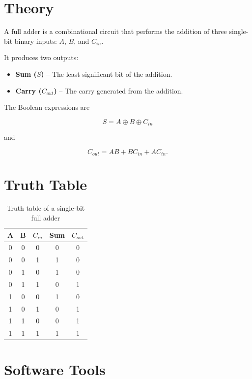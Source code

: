 \documentclass[12pt,a4paper]{report}
\begin{document}
\section{Theory}

A full adder is a combinational circuit that performs the addition of three single-bit binary inputs: $A$, $B$, and $C_{in}$.

It produces two outputs:

\begin{itemize}
    \item \textbf{Sum ($S$)} -- The least significant bit of the addition.
    \item \textbf{Carry ($C_{out}$)} -- The carry generated from the addition.
\end{itemize}

The Boolean expressions are

\[
S=A\oplus B\oplus C_{in}
\]

and

\[
C_{out}=AB+BC_{in}+AC_{in}.
\]


\section{Truth Table}

\begin{table}[H]
    \centering
    \begin{tabular}{|c|c|c|c|c|}
        \hline
        \textbf{A} & \textbf{B} & \textbf{$C_{in}$} & \textbf{Sum} & \textbf{$C_{out}$} \\
        \hline
        0 & 0 & 0 & 0 & 0 \\
        \hline
        0 & 0 & 1 & 1 & 0 \\
        \hline
        0 & 1 & 0 & 1 & 0 \\
        \hline
        0 & 1 & 1 & 0 & 1 \\
        \hline
        1 & 0 & 0 & 1 & 0 \\
        \hline
        1 & 0 & 1 & 0 & 1 \\
        \hline
        1 & 1 & 0 & 0 & 1 \\
        \hline
        1 & 1 & 1 & 1 & 1 \\
        \hline
    \end{tabular}
    \caption{Truth table of a single-bit full adder}
    \label{tab:full_adder}
\end{table}

\section{Software Tools}
\end{document}
